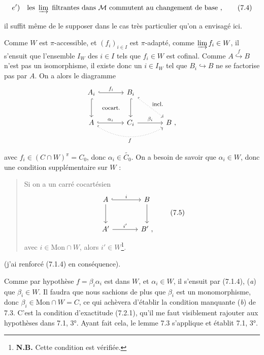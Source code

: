 \documentclass[11pt]{article}
\newcommand{\printedpage}[1]{\marginpar{\footnotesize p.~#1}}
\newcommand{\msp}[1]{\marginpar{\footnotesize [#1]}}
\newcommand{\Mon}{\mathrm{Mon}}
\begin{document}
\msp{page 95}
\[
e')\quad \text{les } \varinjlim \text{ filtrantes dans } \mathcal{M} \text{ commutent au changement de base}\ , \tag*{(7.4)}
\]

il suffit même de le supposer dans le cas très particulier qu'on a envisagé ici.

Comme $W$ est $\pi$-accessible, et $(f_i)_{i \in I}$ est $\pi$-adapté, comme $\varinjlim f_i \in W$, il s'ensuit que l'ensemble $I_W$ des $i \in I$ tels que $f_i \in W$ est cofinal. Comme $A \overset{f}{\hookrightarrow} B$ n'est pas un isomorphisme, il existe donc un $i \in I_W$ tel que $B_i \hookrightarrow B$ ne se factorise pas par $A$. On a alors le diagramme
\[
\begin{tikzcd}[row sep=large, column sep=large]
A_i \arrow[r, hook, "f_i"] \arrow[d, hook] \arrow[rd, phantom, "\text{\footnotesize cocart.}"] & B_i \arrow[d, hook] \arrow[rd, dotted, hook, "\text{\footnotesize incl.}"] & \\
A \arrow[r, hook, "\alpha_i"] \arrow[rr, dotted, hook, bend right, "f"'] & C_i \arrow[r, "\beta_i"] & B \ ,
\end{tikzcd}
\]

\printedpage{53}
avec $f_i \in (C \cap W)^{\pi} = C_0$, donc $\alpha_i \in \widetilde{C_0}$. On a besoin de savoir que $\alpha_i \in W$, donc une condition supplémentaire sur $W$ :

\begin{quote}
Si on a un carré cocartésien
\[
\begin{tikzcd}[row sep=large, column sep=large]
A \arrow[r, hook, "i"] \arrow[d] & B \arrow[d] \\
A' \arrow[r, "{i'}"] & B' \ ,
\end{tikzcd}
\tag*{(7.5)}
\]
avec $i \in \Mon \cap W$, alors $i' \in W$\footnote[34]{\textbf{N.B.} Cette condition est vérifiée.}.
\end{quote}

(j'ai renforcé (7.1.4) en conséquence).

\msp{page 96}

Comme par hypothèse $f = \beta_i \alpha_i$ est dans $W$, et $\alpha_i \in W$, il s'ensuit par (7.1.4), (\textit{a}) que $\beta_i \in W$. Il faudra que nous sachions de plus que $\beta_i$ est un monomorphisme, donc $\beta_i \in \Mon \cap W = C$, ce qui achèvera d'établir la condition manquante (\textit{b}) de 7.3. C'est la condition d'exactitude (7.2.1), qu'il me faut visiblement rajouter aux hypothèses dans 7.1, 3°. Ayant fait cela, le lemme 7.3 s'applique et établit 7.1, 3°.
\end{document}
